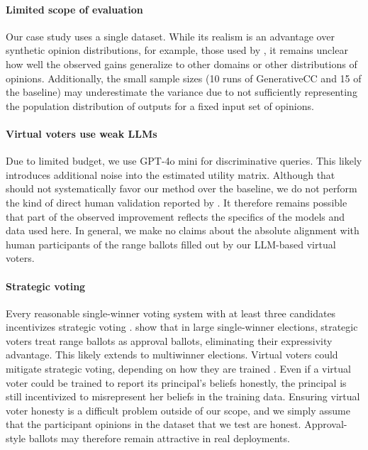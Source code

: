\documentclass[letterpaper]{article} %
\begin{document}
\paragraph{Limited scope of evaluation}
Our case study uses a single dataset.
While its realism is an advantage over synthetic opinion distributions, for example, those used by \citet{chandak-2023}, it remains unclear how well the observed gains generalize to other domains or other distributions of opinions.
Additionally, the small sample sizes (10 runs of GenerativeCC and 15 of the baseline) may underestimate the variance due to not sufficiently representing the population distribution of outputs for a fixed input set of opinions.

\paragraph{Virtual voters use weak LLMs}
Due to limited budget, we use GPT-4o mini for discriminative queries.
This likely introduces additional noise into the estimated utility matrix.
Although that should not systematically favor our method over the baseline, we do not perform the kind of direct human validation reported by \citet{fish-v2}.
It therefore remains possible that part of the observed improvement reflects the specifics of the models and data used here.
In general, we make no claims about the absolute alignment with human participants of the range ballots filled out by our LLM-based virtual voters.

\paragraph{Strategic voting}
Every reasonable single-winner voting system with at least three candidates incentivizes strategic voting \citep{gibbards-theorem}.
\citet{preference-overstating} show that in large single-winner elections, strategic voters treat range ballots as approval ballots, eliminating their expressivity advantage.
This likely extends to multiwinner elections.
Virtual voters could mitigate strategic voting, depending on how they are trained \citep{rangevoting-range-voting, newberry-moral-parliaments}.
Even if a virtual voter could be trained to report its principal's beliefs honestly, the principal is still incentivized to misrepresent her beliefs in the training data.
Ensuring virtual voter honesty is a difficult problem outside of our scope, and we simply assume that the participant opinions in the dataset that we test are honest.
Approval-style ballots may therefore remain attractive in real deployments.
\end{document}
